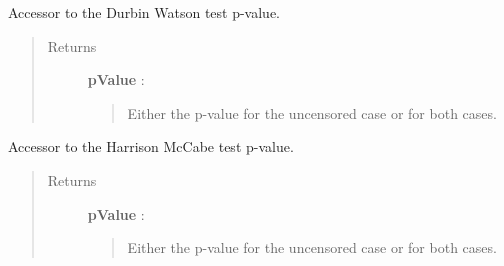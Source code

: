 \documentclass[letterpaper,10pt,english]{sphinxmanual}
\begin{document}
\begin{fulllineitems}
\begin{fulllineitems}
\label{_generated/otpod.UnivariateLinearModelAnalysis:otpod.UnivariateLinearModelAnalysis.getDurbinWatsonPValue}
Accessor to the Durbin Watson test p-value.
\begin{quote}\begin{description}
\item[{Returns}] \leavevmode
\textbf{pValue} : \href{http://doc.openturns.org/openturns-latest/sphinx/user\_manual/\_generated/openturns.NumericalPoint.html\#openturns.NumericalPoint}{}
\begin{quote}

Either the p-value for the uncensored case or for both cases.
\end{quote}

\end{description}\end{quote}

\end{fulllineitems}


\begin{fulllineitems}
\label{_generated/otpod.UnivariateLinearModelAnalysis:otpod.UnivariateLinearModelAnalysis.getHarrisonMcCabePValue}
Accessor to the Harrison McCabe test p-value.
\begin{quote}\begin{description}
\item[{Returns}] \leavevmode
\textbf{pValue} : \href{http://doc.openturns.org/openturns-latest/sphinx/user\_manual/\_generated/openturns.NumericalPoint.html\#openturns.NumericalPoint}{}
\begin{quote}

Either the p-value for the uncensored case or for both cases.
\end{quote}

\end{description}\end{quote}

\end{fulllineitems}



\end{fulllineitems}
\end{document}
